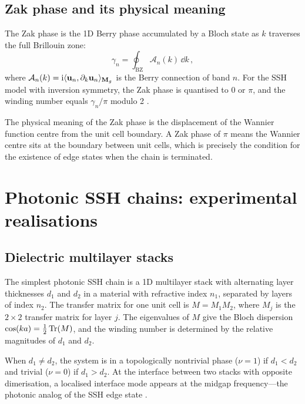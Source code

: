 \subsection{Zak phase and its physical meaning}
\label{sec:ch14-zak-phase}

The Zak phase is the 1D Berry phase accumulated by a Bloch state
as $k$ traverses the full Brillouin zone:
\begin{equation}\label{eq:ch14-zak-formula}
  \gamma_n = \oint_{\mathrm{BZ}}\mathcal{A}_n(k)\,\dd k\,,
\end{equation}
where $\mathcal{A}_n(k)=\mathrm{i}\langle \mathbf{u}_n , \partial_k\mathbf{u}_n \rangle_{\mathbf{M}_g}$
is the Berry connection of band $n$.  For the SSH model with
inversion symmetry, the Zak phase is quantised to $0$ or $\pi$,
and the winding number equals $\gamma_n/\pi$ modulo 2
\cite{asbth2016berry,ozawa2018topological}.

The physical meaning of the Zak phase is the displacement of the
Wannier function centre from the unit cell boundary.  A Zak phase of
$\pi$ means the Wannier centre sits at the boundary between unit
cells, which is precisely the condition for the existence of edge
states when the chain is terminated.

\section{Photonic SSH chains: experimental realisations}
\label{sec:ch14-photonic-ssh}

\subsection{Dielectric multilayer stacks}
\label{sec:ch14-multilayer}

The simplest photonic SSH chain is a 1D multilayer stack with
alternating layer thicknesses $d_1$ and $d_2$ in a material with
refractive index $n_1$, separated by layers of index $n_2$.
The transfer matrix for one unit cell is
$M=M_1 M_2$, where $M_j$ is the $2\times 2$ transfer matrix for
layer $j$.  The eigenvalues of $M$ give the Bloch dispersion
$\cos(ka)=\frac{1}{2}\operatorname{Tr}(M)$, and the winding number is determined
by the relative magnitudes of $d_1$ and $d_2$.

When $d_1\neq d_2$, the system is in a topologically nontrivial phase
($\nu=1$) if $d_1<d_2$ and trivial ($\nu=0$) if $d_1>d_2$.  At the
interface between two stacks with opposite dimerisation, a localised
interface mode appears at the midgap frequency---the photonic analog
of the SSH edge state \cite{ozawa2018topological,price2022roadmap}.

